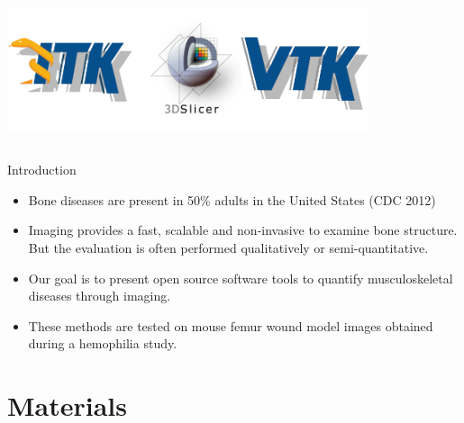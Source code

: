 \documentclass[10pt,aspectratio=169]{beamer}
\begin{document}
\begin{frame}
\begin{columns}[onlytextwidth]
    \includegraphics[width=0.9\textwidth]{./logos/kitware_itk_slicer_vtk_logos.png}
  \end{columns}

\end{frame}

\begin{frame}[fragile]{Introduction}
\begin{itemize} \itemsep1em
\item Bone diseases are present in 50\% adults in the United States (CDC 2012)

\item Imaging provides a fast, scalable and non-invasive to examine bone structure. But the evaluation is often performed qualitatively or semi-quantitative.

\item Our goal is to present open source software tools to quantify musculoskeletal diseases through imaging.

\item These methods are tested on mouse femur wound model images obtained during a hemophilia study.
\end{itemize}

\end{frame}

\section{Materials}
\end{document}
